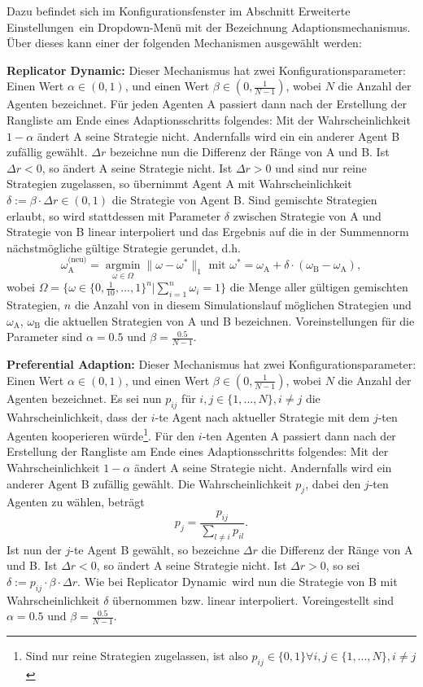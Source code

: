 \documentclass[parskip=full,11pt,twoside]{scrartcl}
\def\adapt{Adaptionsschritt}
\begin{document}
Dazu befindet sich im Konfigurationsfenster im Abschnitt \glqq Erweiterte Einstellungen\grqq\ ein Dropdown-Menü mit der Bezeichnung \glqq Adaptionsmechanismus\grqq. Über dieses kann einer der folgenden Mechanismen ausgewählt werden:

\textbf{Replicator Dynamic:}
Dieser Mechanismus hat zwei Konfigurationsparameter: Einen Wert \(\alpha \in (0,1)\), und einen Wert \(\beta \in (0,\frac{1}{N-1})\), wobei \(N\) die Anzahl der Agenten bezeichnet. Für jeden Agenten A passiert dann nach der Erstellung der Rangliste am Ende eines \adapt s folgendes: Mit der Wahrscheinlichkeit \(1 - \alpha\) ändert A seine Strategie nicht. Andernfalls wird ein ein anderer Agent B zufällig gewählt. \(\Delta r\) bezeichne nun die Differenz der Ränge von A und B. Ist \(\Delta r < 0\), so ändert A seine Strategie nicht. Ist \(\Delta r > 0\) und sind nur reine Strategien zugelassen, so übernimmt Agent A mit Wahrscheinlichkeit \(\delta := \beta \cdot \Delta r \in (0,1)\) die Strategie von Agent B. Sind gemischte Strategien erlaubt, so wird stattdessen mit Parameter \(\delta\) zwischen Strategie von A und Strategie von B linear interpoliert und das Ergebnis auf die in der Summennorm nächstmögliche gültige Strategie gerundet, d.h.
\[
\omega_\text{A}^\text{(neu)} = \underset{\omega \in \Omega}{\operatorname{arg min}} \|\omega - \omega^*\|_1 \text{  mit  } \omega^* = \omega_\text{A} + \delta \cdot (\omega_\text{B} - \omega_\text{A}),
\]
wobei \(\Omega = \{\omega \in \{0,\frac{1}{10},...,1\}^n | \sum_{i=1}^n \omega_i = 1\}\) die Menge aller gültigen gemischten Strategien, \(n\) die Anzahl von in diesem Simulationslauf möglichen Strategien und \(\omega_\text{A}\), \(\omega_\text{B}\) die aktuellen Strategien von A und B bezeichnen. Voreinstellungen für die Parameter sind \(\alpha = 0.5\) und \(\beta = \frac{0.5}{N - 1}\).

\textbf{Preferential Adaption:}
Dieser Mechanismus hat zwei Konfigurationsparameter: Einen Wert \(\alpha \in (0,1)\), und einen Wert \(\beta \in (0,\frac{1}{N-1})\), wobei \(N\) die Anzahl der Agenten bezeichnet. Es sei nun \(p_{ij}\) für \(i,j \in \{1,...,N\}, i \neq j\) die Wahrscheinlichkeit, dass der \(i\)-te Agent nach aktueller Strategie mit dem \(j\)-ten Agenten kooperieren würde\footnote{Sind nur reine Strategien zugelassen, ist also \(p_{ij} \in \{0,1\} \forall i,j \in \{1,...,N\}, i \neq j\)}. Für den \(i\)-ten Agenten A passiert dann nach der Erstellung der Rangliste am Ende eines \adapt s folgendes: Mit der Wahrscheinlichkeit \(1 - \alpha\) ändert A seine Strategie nicht. Andernfalls wird ein anderer Agent B zufällig gewählt. Die Wahrscheinlichkeit \(p_j\), dabei den \(j\)-ten Agenten zu wählen, beträgt
\[
p_j = \frac{p_{ij}}{\sum_{l \neq i} p_{il}}.
\]
Ist nun der \(j\)-te Agent B gewählt, so bezeichne \(\Delta r\) die Differenz der Ränge von A und B. Ist \(\Delta r < 0\), so ändert A seine Strategie nicht. Ist \(\Delta r > 0\), so sei \(\delta := p_{ij} \cdot \beta \cdot \Delta r\). Wie bei \glqq Replicator Dynamic\grqq\ wird nun die Strategie von B mit Wahrscheinlichkeit \(\delta\) übernommen bzw. linear interpoliert. Voreingestellt sind \(\alpha = 0.5\) und \(\beta = \frac{0.5}{N - 1}\).
\end{document}
